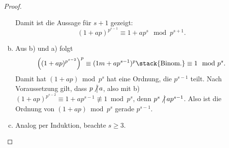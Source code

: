 \begin{lem}
\begin{proof}
\begin{enumerate}[a)]
\[				\]
				Damit ist die Aussage für $s + 1$ gezeigt:
				\[
					(1 + ap)^{p^{s-1}}
					\equiv 1 + ap^s \mod p^{s+1}.
				\]
			\item
				Aus b) und a) folgt
				\[
					\Big( (1+ap)^{p^{s-2}} \Big)^p
					\equiv (1m + ap^{s-1})^p
					\stack{\text{Binom.}}\equiv 1 \mod p^s.
				\]
				Damit hat $(1 + ap) \bmod p^s$ hat eine Ordnung, die $p^{s-1}$ teilt.
				Nach Voraussetzung gilt, dass $p \ndivs a$, also mit b) $(1 + ap)^{p^{s-2}} \equiv 1 + ap^{s-1} \not\equiv 1 \bmod p^s$, denn $p^s \ndivs ap^{s-1}$.
				Also ist die Ordnung von $(1 + ap) \bmod p^s$ gerade $p^{s-1}$.
			\item
				Analog per Induktion, beachte $s \ge 3$.
				\Exercise
		\end{enumerate}
	\end{proof}
\end{lem}

